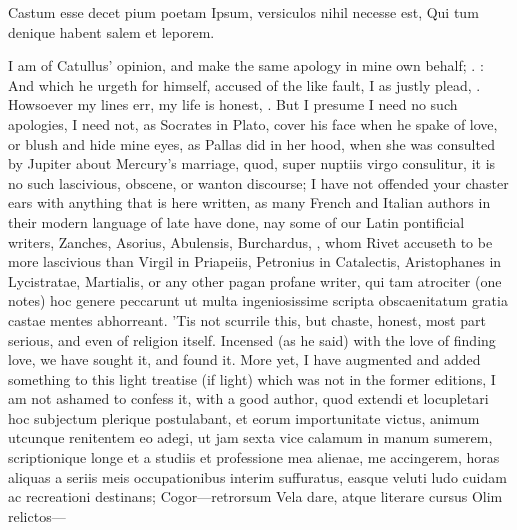 {Castum esse decet pium poetam
Ipsum, versiculos nihil necesse est,
Qui tum denique habent salem et leporem.

I am of Catullus' opinion, and make the same apology in mine own
behalf; .  : And which he urgeth for himself,
accused of the like fault, I as justly plead, . Howsoever my lines err, my life is honest,
. But I presume I need no
such apologies, I need not, as Socrates in Plato, cover his face when
he spake of love, or blush and hide mine eyes, as Pallas did in her
hood, when she was consulted by Jupiter about Mercury's marriage, quod,
super nuptiis virgo consulitur, it is no such lascivious, obscene, or
wanton discourse; I have not offended your chaster ears with anything
that is here written, as many French and Italian authors in their
modern language of late have done, nay some of our Latin pontificial
writers, Zanches, Asorius, Abulensis, Burchardus, \etc{}, whom Rivet
accuseth to be more lascivious than Virgil in Priapeiis, Petronius in
Catalectis, Aristophanes in Lycistratae, Martialis, or any other pagan
profane writer, qui tam atrociter (one notes) hoc genere
peccarunt ut multa ingeniosissime scripta obscaenitatum gratia castae
mentes abhorreant. 'Tis not scurrile this, but chaste, honest, most
part serious, and even of religion itself. Incensed (as he said)
with the love of finding love, we have sought it, and found it. More
yet, I have augmented and added something to this light treatise (if
light) which was not in the former editions, I am not ashamed to
confess it, with a good author, quod extendi et locupletari hoc
subjectum plerique postulabant, et eorum importunitate victus, animum
utcunque renitentem eo adegi, ut jam sexta vice calamum in manum
sumerem, scriptionique longe et a studiis et professione mea alienae,
me accingerem, horas aliquas a seriis meis occupationibus interim
suffuratus, easque veluti ludo cuidam ac recreationi destinans;
Cogor---retrorsum
Vela dare, atque literare cursus
Olim relictos---

}
